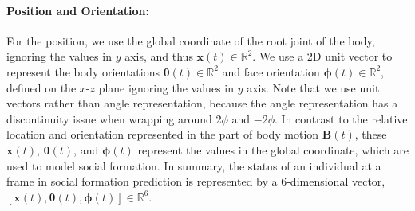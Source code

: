 \paragraph{Position and Orientation:} For the position, we use the global coordinate of the root joint of the body, ignoring the values in $y$ axis, and thus $\mathbf{x}(t) \in \mathbb{R}^2$.
We use a 2D unit vector to represent the body orientations $\boldsymbol\theta (t) \in \mathbb {R}^2$ and face orientation $\boldsymbol\phi (t) \in \mathbb{R}^2$, defined on the $x$-$z$ plane ignoring the values in $y$ axis. Note that we use unit vectors rather than angle representation, because the angle representation has a discontinuity issue when wrapping around $2\phi$ and $-2\phi$. In contrast to the relative location and orientation represented in the part of body motion $\mathbf{B}(t)$, these $\mathbf{x}(t)$, $\boldsymbol\theta (t)$, and $\boldsymbol\phi (t)$ represent the values in the global coordinate, which are used to model social formation. In summary, the status of an individual at a frame in social formation prediction is represented by a 6-dimensional vector, $[\mathbf{x}(t), \boldsymbol{\theta}(t), \boldsymbol{\phi}(t) ] \in \mathbb{R}^6$.

